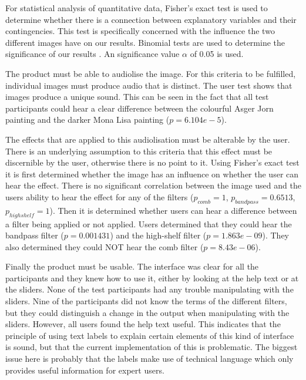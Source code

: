 For statistical analysis of quantitative data, Fisher's exact test is used to determine whether there is a connection between explanatory variables and their contingencies. This test is specifically concerned with the influence the two different images have on our results. Binomial tests are used to determine the significance of our results \cite{crawley2005statistics}. An significance value $\alpha$ of 0.05 is used.

The product must be able to audiolise the image. For this criteria to be fulfilled, individual images must produce audio that is distinct. The user test shows that images produce a unique sound. This can be seen in the fact that all test participants could hear a clear difference between the colourful Asger Jorn painting and the darker Mona Lisa painting ($p=6.104e-5$). 

The effects that are applied to this audiolisation must be alterable by the user. There is an underlying assumption to this criteria that this effect must be discernible by the user, otherwise there is no point to it. Using Fisher's exact test it is first determined whether the image has an influence on whether the user can hear the effect. There is no significant correlation between the image used and the users ability to hear the effect for any of the filters ($p_{comb}=1$, $p_{bandpass}=0.6513$, $p_{highshelf}=1$). Then it is determined whether users can hear a difference between a filter being applied or not applied. Users determined that they could hear the bandpass filter ($p=0.001431$) and the high-shelf filter ($p=1.863e-09$). They also determined they could NOT hear the comb filter ($p=8.43e-06$).

Finally the product must be usable. The interface was clear for all the participants and they knew how to use it, either by looking at the help text or at the sliders. None of the test participants had any trouble manipulating with the sliders. Nine of the participants did not know the terms of the different filters, but they could distinguish a change in the output when manipulating with the sliders. However, all users found the help text useful. This indicates that the principle of using text labels to explain certain elements of this kind of interface is sound, but that the current implementation of this is problematic. The biggest issue here is probably that the labels make use of technical language which only provides useful information for expert users.
 
